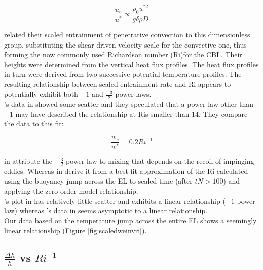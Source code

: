 \begin{equation}
\frac{u_{e}}{u^{*}} \propto \frac{\rho_{0} u^{*2}}{g \delta \rho D} 
\end{equation}

\citeauthor{DearWill80} related their scaled entrainment of penetrative convection to this dimensionless group, substituting the shear driven velocity scale for the convective one, thus forming the now commonly used Richardson number (\acs{Ri})for the \acs{CBL}.  Their heights were determined from the vertical heat flux profiles.  The heat flux profiles in turn were derived from two successive potential temperature profiles.  The resulting relationship between scaled entrainment rate and \acs{Ri} appears to potentially exhibit both $-1$ and $\frac{-3}{2}$ power laws.\\

\citeauthor{SullMoengStev}'s data in \cite{SullMoengStev} showed some scatter and they speculated that a power law other than $-1$ may have described the relationship at \acs{Ri}s smaller than 14.  They compare the data to this fit:

\begin{equation}
\frac{w_{e}}{w^{*}}=0.2 Ri^{-1}
\end{equation}

\citeauthor{Turner86} in \cite{Turner86} attribute the $-\frac{3}{2}$ power law to mixing that depends on the recoil of impinging eddies.  Whereas \citeauthor{FedConzMir04} in \cite{FedConzMir04} derive it from a best fit approximation of the \acs{Ri} calculated using the buoyancy jump across the \acs{EL} to scaled time (after $tN>100$) and applying the zero order model relationship.\\

\citeauthor{BrooksFowler2}'s plot in \cite{BrooksFowler2} has relatively little scatter and exhibits a linear relationship ($-1$ power law) whereas \citeauthor{GarciaMellado}'s data in \cite{GarciaMellado} seems asymptotic to a linear relationship.\\

Our data based on the temperature jump across the entire \acs{EL} shows a seemingly linear relationship (Figure \ref{fig:scaledweinvri}). 


\subsection{$\frac{\Delta h}{h}$ vs $Ri^{-1}$}
\label{subsec:deltahri}
\FloatBarrier

